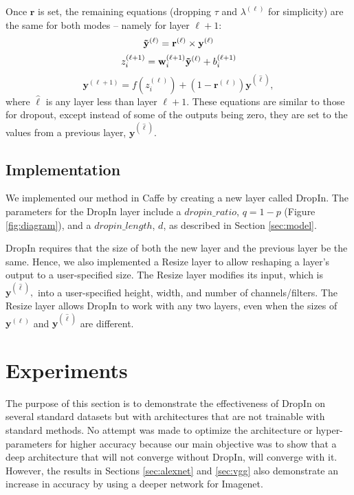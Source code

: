 \documentclass[10pt,twocolumn,letterpaper]{article}
\newcommand{\dropin}{DropIn }
\newcommand{\dropinNS}{DropIn}
\begin{document}
Once $ \mathbf{r} $  is set, the remaining equations (dropping $\tau$ and $\lambda^{(\ell)}$ for simplicity) are the same for both modes -- namely for layer $ {\ell+1}$:
\begin{equation}
\mathbf{\tilde{y}}^{(\ell)} = \mathbf{r}^{(\ell)} \times \mathbf{y}^{(\ell)}  \\
\end{equation}
\begin{equation}
z^{(\ell+1)}_i  = \mathbf{w}^{(\ell+1)}_i \mathbf{\tilde{y}}^{(\ell)} + b_i^{(\ell+1)} \\
\end{equation}
\begin{equation}
\mathbf{y}^{(\ell+1)} = f ( z_i^{(\ell)} ) + ( 1 - \mathbf{r}^{(\ell)} )  \mathbf{y}^{(\hat{\ell})},
\end{equation}
where $ \hat{\ell} $ is any layer less than layer $ {\ell+1}$.
These equations are similar to those for dropout, except instead of some of the outputs being zero, they are set to the values from a previous layer, $ \mathbf{y}^{(\hat{\ell})} $.


\subsection{Implementation}
\label{sec:code}

We implemented our method in Caffe \cite{Caffe14} by creating a new layer called \dropinNS.
The parameters for the \dropin layer include a $dropin\_ratio$, $ q = 1 - p$ (Figure \ref{fig:diagram}), and a $dropin\_length$, $d$, as described in Section \ref{sec:model}.

\dropin requires that the size of both the new layer and the previous layer be the same.
Hence, we also implemented a Resize layer to allow reshaping a layer's output to a user-specified size.
The Resize layer modifies its input, which is $ \mathbf{y}^{(\hat{\ell})},$ into a user-specified height, width, and number of channels/filters. 
The Resize layer allows \dropin to work with any two layers, even when the sizes of $ \mathbf{y}^{(\ell)}$ and $ \mathbf{y}^{(\hat{\ell})} $ are different.


\section{Experiments}
\label{sec:experiments}

The purpose of this section is to demonstrate the effectiveness of \dropin on several standard datasets but with  architectures that are not trainable with standard methods.
No attempt was made to optimize the architecture or hyper-parameters for higher accuracy because our main objective was to show that a deep architecture that will not converge without \dropinNS, will converge with it.
However, the results in Sections  \ref{sec:alexnet} and \ref{sec:vgg}  also demonstrate an increase in accuracy by using a deeper network for Imagenet.
\end{document}
